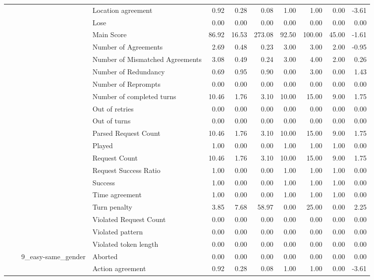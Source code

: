 \begin{tabular}{llllrrrrrrr}
 &  &  & Location agreement & 0.92 & 0.28 & 0.08 & 1.00 & 1.00 & 0.00 & -3.61 \\
 &  &  & Lose & 0.00 & 0.00 & 0.00 & 0.00 & 0.00 & 0.00 & 0.00 \\
 &  &  & Main Score & 86.92 & 16.53 & 273.08 & 92.50 & 100.00 & 45.00 & -1.61 \\
 &  &  & Number of Agreements & 2.69 & 0.48 & 0.23 & 3.00 & 3.00 & 2.00 & -0.95 \\
 &  &  & Number of Mismatched Agreements & 3.08 & 0.49 & 0.24 & 3.00 & 4.00 & 2.00 & 0.26 \\
 &  &  & Number of Redundancy & 0.69 & 0.95 & 0.90 & 0.00 & 3.00 & 0.00 & 1.43 \\
 &  &  & Number of Reprompts & 0.00 & 0.00 & 0.00 & 0.00 & 0.00 & 0.00 & 0.00 \\
 &  &  & Number of completed turns & 10.46 & 1.76 & 3.10 & 10.00 & 15.00 & 9.00 & 1.75 \\
 &  &  & Out of retries & 0.00 & 0.00 & 0.00 & 0.00 & 0.00 & 0.00 & 0.00 \\
 &  &  & Out of turns & 0.00 & 0.00 & 0.00 & 0.00 & 0.00 & 0.00 & 0.00 \\
 &  &  & Parsed Request Count & 10.46 & 1.76 & 3.10 & 10.00 & 15.00 & 9.00 & 1.75 \\
 &  &  & Played & 1.00 & 0.00 & 0.00 & 1.00 & 1.00 & 1.00 & 0.00 \\
 &  &  & Request Count & 10.46 & 1.76 & 3.10 & 10.00 & 15.00 & 9.00 & 1.75 \\
 &  &  & Request Success Ratio & 1.00 & 0.00 & 0.00 & 1.00 & 1.00 & 1.00 & 0.00 \\
 &  &  & Success & 1.00 & 0.00 & 0.00 & 1.00 & 1.00 & 1.00 & 0.00 \\
 &  &  & Time agreement & 1.00 & 0.00 & 0.00 & 1.00 & 1.00 & 1.00 & 0.00 \\
 &  &  & Turn penalty & 3.85 & 7.68 & 58.97 & 0.00 & 25.00 & 0.00 & 2.25 \\
 &  &  & Violated Request Count & 0.00 & 0.00 & 0.00 & 0.00 & 0.00 & 0.00 & 0.00 \\
 &  &  & Violated pattern & 0.00 & 0.00 & 0.00 & 0.00 & 0.00 & 0.00 & 0.00 \\
 &  &  & Violated token length & 0.00 & 0.00 & 0.00 & 0.00 & 0.00 & 0.00 & 0.00 \\
\cline{3-11}
 &  & \multirow[t]{27}{*}{9_easy-same_gender} & Aborted & 0.00 & 0.00 & 0.00 & 0.00 & 0.00 & 0.00 & 0.00 \\
 &  &  & Action agreement & 0.92 & 0.28 & 0.08 & 1.00 & 1.00 & 0.00 & -3.61 \\

\end{tabular}
